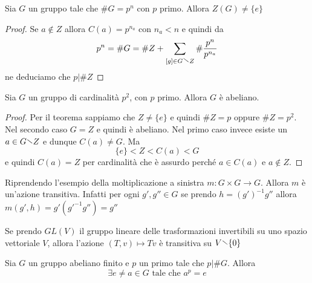\begin{theorem}
    Sia \(G\) un gruppo tale che \(\# G = p^{n}\) con \(p\) primo. Allora
    \(Z{(G)} \neq \{e\} \) 
\end{theorem}
\begin{proof}
    Se \(a \not\in Z\) allora \(C{(a)} = p^{n_a}\) con \(n_a < n\) e quindi da
    \[
        p^{n} = \# G = \# Z + \sum_{[g] \in G\sminus Z} \# \frac{p^{n}}{p^{n_a}}
    \]
    ne deduciamo che \(p | \#Z\) 
\end{proof}
\begin{corollary}
    Sia \(G\) un gruppo di cardinalità \(p^2\), con \(p\) primo. Allora \(G\) è
    abeliano.
\end{corollary}
\begin{proof}
    Per il teorema sappiamo che \(Z \neq \{e\} \) e quindi \(\# Z = p\) oppure
    \(\# Z = p^2\). Nel secondo caso \(G = Z\) e quindi è abeliano. Nel primo
    caso invece esiste un \(a \in G \sminus Z\) e dunque \(C{(a)} \neq G\). Ma
    \[
        \{e\} < Z < C{(a)} < G
    \]
    e quindi \(C{(a)} = Z\) per cardinalità che è assurdo perché \(a \in
    C{(a)}\) e \(a \not\in Z\).
\end{proof}
\begin{example}
    Riprendendo l'esempio della moltiplicazione a sinistra \(m : G \times G \to
    G\). Allora \(m\) è un'azione transitiva. Infatti per ogni \(g', g'' \in G\) se
    prendo \(h = {(g')}^{-1} g''\) allora \(m {(g', h)} = g'{(g'^{-1} g'')} =
    g''\) 
\end{example}
\begin{example}
    Se prendo \(GL{(V)}\) il gruppo lineare delle trasformazioni invertibili su
    uno spazio vettoriale \(V\), allora l'azione \({(T, v)} \mapsto Tv\) è
    transitiva su \(V \sminus \{0\}\)  
\end{example}
\begin{theorem}
    Sia \(G\) un gruppo abeliano finito e \(p\) un primo tale che \(p | \# G\).
    Allora 
    \[
      \exists e\neq a \in G \text{ tale che } a^{p} = e
    \]
\end{theorem}
